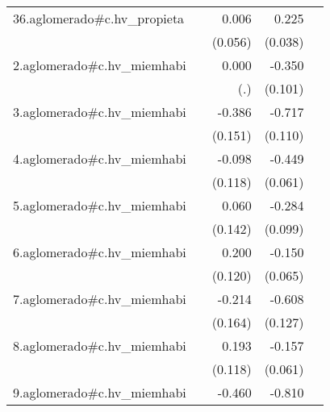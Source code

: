 {\begin{longtable}{l*{4}{D{.}{.}{-1}}}
\addlinespace
36.aglomerado#c.hv\_propieta&                     &       0.006         &       0.225\sym{***}&                     \\
            &                     &     (0.056)         &     (0.038)         &                     \\
\addlinespace
2.aglomerado#c.hv\_miemhabi&                     &       0.000         &      -0.350\sym{***}&                     \\
            &                     &         (.)         &     (0.101)         &                     \\
\addlinespace
3.aglomerado#c.hv\_miemhabi&                     &      -0.386\sym{*}  &      -0.717\sym{***}&                     \\
            &                     &     (0.151)         &     (0.110)         &                     \\
\addlinespace
4.aglomerado#c.hv\_miemhabi&                     &      -0.098         &      -0.449\sym{***}&                     \\
            &                     &     (0.118)         &     (0.061)         &                     \\
\addlinespace
5.aglomerado#c.hv\_miemhabi&                     &       0.060         &      -0.284\sym{**} &                     \\
            &                     &     (0.142)         &     (0.099)         &                     \\
\addlinespace
6.aglomerado#c.hv\_miemhabi&                     &       0.200         &      -0.150\sym{*}  &                     \\
            &                     &     (0.120)         &     (0.065)         &                     \\
\addlinespace
7.aglomerado#c.hv\_miemhabi&                     &      -0.214         &      -0.608\sym{***}&                     \\
            &                     &     (0.164)         &     (0.127)         &                     \\
\addlinespace
8.aglomerado#c.hv\_miemhabi&                     &       0.193         &      -0.157\sym{**} &                     \\
            &                     &     (0.118)         &     (0.061)         &                     \\
\addlinespace
9.aglomerado#c.hv\_miemhabi&                     &      -0.460\sym{**} &      -0.810\sym{***}&                     \\

\end{longtable}}
